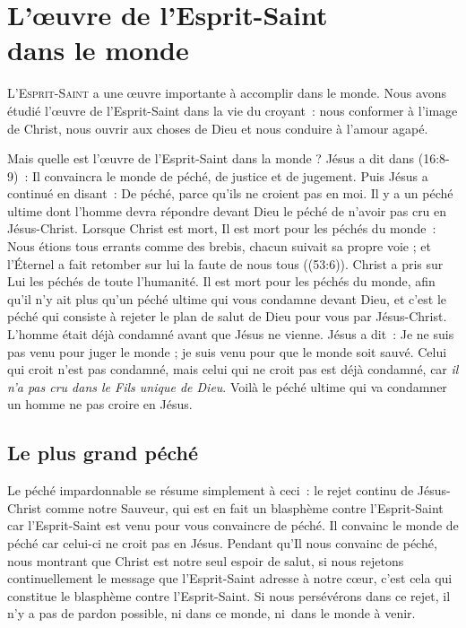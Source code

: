 \chapter[L'\oe{}uvre de l'Esprit-Saint dans le monde]{L'\oe{}uvre de l'Esprit-Saint\\ dans le monde}

\lettrine{L}{'Esprit-Saint} a une œuvre importante
 à accomplir dans le monde.
 Nous avons étudié l'œuvre de l'Esprit-Saint dans la vie du croyant~:
 nous conformer à l'image de Christ, nous ouvrir aux choses de Dieu
 et nous conduire à l'amour agapé.

Mais quelle est l'œuvre de l'Esprit-Saint dans la monde ?
 Jésus a dit dans (16:8-9)~:
 \Og Il convaincra le monde de péché, de justice et de jugement. \Fg{}
 Puis Jésus a continué en disant~:
 \Og De péché, parce qu'ils ne croient pas en moi. \Fg{}
 Il y a un péché ultime dont l'homme devra répondre devant Dieu
 \ocadr le péché de n'avoir pas cru en Jésus-Christ.
 Lorsque Christ est mort, Il est mort pour les péchés du monde~:
 \Og Nous étions tous errants comme des brebis,
 chacun suivait sa propre voie ;
 et l'Éternel a fait retomber sur lui la faute de nous tous \Fg{}
 ((53:6)).
 Christ a pris sur Lui les péchés de toute l'humanité.
 Il est mort pour les péchés du monde, afin qu'il n'y ait plus qu'un péché
 ultime qui vous condamne devant Dieu, et c'est le péché qui consiste
 à rejeter le plan de salut de Dieu pour vous par Jésus-Christ.
 L'homme était déjà condamné avant que Jésus ne vienne.
 Jésus a dit~: \Og Je ne suis pas venu pour juger le monde ;
 je suis venu pour que le monde soit sauvé.
 Celui qui croit n'est pas condamné, mais celui qui ne croit pas
 est déjà condamné, car \emph{il n'a pas cru dans le Fils
 unique de Dieu}. \Fg{}
 Voilà le péché ultime qui va condamner un homme
 \ocadr ne pas croire en Jésus.


\section{Le plus grand p\'ech\'e}


Le péché impardonnable se résume simplement à ceci~:
 le rejet continu de Jésus-Christ comme notre Sauveur,
 qui est en fait un blasphème contre l'Esprit-Saint
 car l'Esprit-Saint est venu pour vous con\-vaincre de péché.
 Il \Og convainc le monde de péché \Fg{} car celui-ci
 ne croit pas en Jésus.
 Pendant qu'Il nous convainc de péché, nous montrant que Christ
 est notre seul espoir de salut, si nous rejetons continuellement
 le message que l'Esprit-Saint adresse à notre cœur,
 c'est cela qui constitue le blasphème contre l'Esprit-Saint.
 Si nous persévérons dans ce rejet, il n'y a pas de pardon possible,
 ni dans ce monde, ni~dans le monde à venir. %

